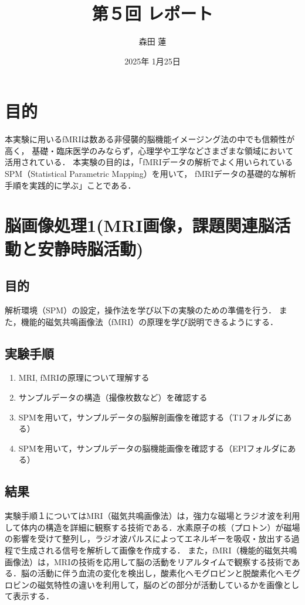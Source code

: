 \documentclass{jlreq}
\title{第５回 レポート}
\author{森田 蓮}
\date{2025年 1月25日}
\begin{document}
\maketitle

\section{目的}
本実験に用いるfMRIは数ある非侵襲的脳機能イメージング法の中でも信頼性が高く，
基礎・臨床医学のみならず，心理学や工学などさまざまな領域において活用されている．
本実験の目的は，「fMRIデータの解析でよく用いられているSPM（Statistical Parametric Mapping）を用いて，
fMRIデータの基礎的な解析手順を実践的に学ぶ」ことである．

\section{脳画像処理1(MRI画像，課題関連脳活動と安静時脳活動)}
\subsection{目的}
解析環境（SPM）の設定，操作法を学び以下の実験のための準備を行う．
また，機能的磁気共鳴画像法（fMRI）の原理を学び説明できるようにする．
\subsection{実験手順}
\begin{enumerate}
    \item MRI, fMRIの原理について理解する 
    \item サンプルデータの構造（撮像枚数など）を確認する
    \item SPMを用いて，サンプルデータの脳解剖画像を確認する（T1フォルダにある）
    \item SPMを用いて，サンプルデータの脳機能画像を確認する（EPIフォルダにある）
\end{enumerate}
\subsection{結果}
実験手順１についてはMRI（磁気共鳴画像法）は，強力な磁場とラジオ波を利用して体内の構造を詳細に観察する技術である．水素原子の核（プロトン）が磁場の影響を受けて整列し，ラジオ波パルスによってエネルギーを吸収・放出する過程で生成される信号を解析して画像を作成する．
また，fMRI（機能的磁気共鳴画像法）は，MRIの技術を応用して脳の活動をリアルタイムで観察する技術である．脳の活動に伴う血流の変化を検出し，酸素化ヘモグロビンと脱酸素化ヘモグロビンの磁気特性の違いを利用して，脳のどの部分が活動しているかを画像として表示する．
\end{document}
